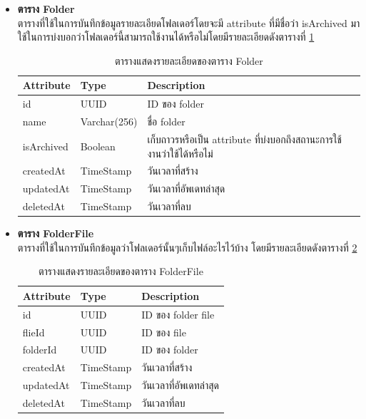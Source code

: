 \documentclass[12pt,oneside,openright,a4paper]{cpe-thai-project}
\begin{document}
\begin{itemize}
\newpage
\item \textbf{ตาราง Folder}\\
ตารางที่ใช้ในการบันทึกข้อมูลรายละเอียดโฟลเดอร์โดยจะมี attribute ที่มีชื่อว่า isArchived มาใช้ในการบ่งบอกว่าโฟลเดอร์นี้สามารถใช้งานได้หรือไม่โดยมีรายละเอียดดังตารางที่ \ref{tbl:dbFolder}
\begin{table}[!ht]
    \centering
    \begin{tabular}{|p{4cm}|p{2cm}|p{6cm}|}
    \hline
    \textbf{Attribute} & \textbf{Type} & \textbf{Description}   \\ \hline
    id        & UUID        & ID ของ folder          \\ \hline
    name      & Varchar(256) & ชื่อ folder            \\ \hline
    isArchived         & Boolean          & เก็บถาวรหรือเป็น attribute ที่บ่งบอกถึงสถานะการใช้งานว่าใช้ได้หรือไม่ \\ \hline
    createdAt & TimeStamp   & วันเวลาที่สร้าง        \\ \hline
    updatedAt & TimeStamp   & วันเวลาที่อัพเดทล่าสุด \\ \hline
    deletedAt & TimeStamp   & วันเวลาที่ลบ             \\ \hline
    \end{tabular}
    \caption{\centering  ตารางแสดงรายละเอียดของตาราง Folder} \label{tbl:dbFolder}
\end{table}

\item \textbf{ตาราง FolderFile}\\
ตารางที่ใช้ในการบันทึกข้อมูลว่าโฟลเดอร์นั้นๆเก็บไฟล์อะไรไว้บ้าง โดยมีรายละเอียดดังตารางที่  \ref{tbl:dbFolderFile}
\begin{table}[!ht]
    \centering
    \begin{tabular}{|p{4cm}|p{2cm}|p{6cm}|}
    \hline
    \textbf{Attribute} & \textbf{Type} & \textbf{Description}   \\ \hline
    id        & UUID      & ID ของ folder file     \\ \hline
    flieId    & UUID      & ID ของ file            \\ \hline
    folderId  & UUID      & ID ของ folder          \\ \hline
    createdAt & TimeStamp & วันเวลาที่สร้าง        \\ \hline
    updatedAt & TimeStamp & วันเวลาที่อัพเดทล่าสุด \\ \hline
    deletedAt & TimeStamp & วันเวลาที่ลบ              \\ \hline
    \end{tabular}
    \caption{\centering  ตารางแสดงรายละเอียดของตาราง FolderFile} \label{tbl:dbFolderFile}
\end{table}


\end{itemize}
\end{document}
